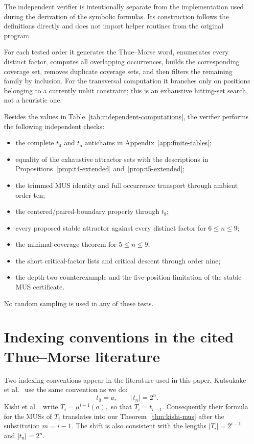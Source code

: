 \documentclass[11pt,a4paper]{article}
\theoremstyle{definition}\newtheorem{definition}[theorem]{Definition}
\theoremstyle{remark}\newtheorem{remark}[theorem]{Remark}
\begin{document}
The independent verifier is intentionally separate from the implementation used during the derivation of the symbolic formulas.  Its construction follows the definitions directly and does not import helper routines from the original program.

For each tested order it generates the Thue--Morse word, enumerates every distinct factor, computes all overlapping occurrences, builds the corresponding coverage set, removes duplicate coverage sets, and then filters the remaining family by inclusion.  For the transversal computation it branches only on positions belonging to a currently unhit constraint; this is an exhaustive hitting-set search, not a heuristic one.

Besides the values in Table~\ref{tab:independent-computations}, the verifier performs the following independent checks:
\begin{itemize}
\item the complete $t_4$ and $t_5$ antichains in Appendix~\ref{app:finite-tables};
\item equality of the exhaustive attractor sets with the descriptions in Propositions~\ref{prop:t4-extended} and~\ref{prop:t5-extended};
\item the trimmed MUS identity and full occurrence transport through ambient order ten;
\item the centered/paired-boundary property through $t_9$;
\item every proposed stable attractor against every distinct factor for $6\le n\le9$;
\item the minimal-coverage theorem for $5\le n\le9$;
\item the short critical-factor lists and critical descent through order nine;
\item the depth-two counterexample and the five-position limitation of the stable MUS certificate.
\end{itemize}

No random sampling is used in any of these tests.


\section{Indexing conventions in the cited Thue--Morse literature}
\label{app:indexing}

Two indexing conventions appear in the literature used in this paper.  Kutsukake et al.~\cite{Kutsukake2020} use the same convention as we do:
\[
 t_0=a,
 \qquad
 |t_n|=2^n.
\]
Kishi et al.~\cite{Kishi2026} write
$
 T_i=\mu^{i-1}(a),
$
so that
$
 T_i=t_{i-1}.
$
Consequently their formula for the MUSs of $T_i$ translates into our Theorem~\ref{thm:kishi-mus} after the substitution $m=i-1$.  The shift is also consistent with the lengths $|T_i|=2^{i-1}$ and $|t_n|=2^n$.
\end{document}
